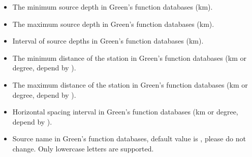 \documentclass[a4paper,10pt,english,openany]{sphinxmanual}
\begin{document}
\begin{itemize}
\item {} 
The minimum source depth in Green’s function databases (km).

\end{itemize}

\begin{itemize}
\item {} 
The maximum source depth in Green’s function databases (km).

\end{itemize}

\begin{itemize}
\item {} 
Interval of source depths in Green’s function databases (km).

\end{itemize}

\begin{itemize}
\item {} 
The minimum distance of the station in Green’s function databases (km or degree, depend by ).

\end{itemize}

\begin{itemize}
\item {} 
The maximum distance of the station in Green’s function databases (km or degree, depend by ).

\end{itemize}

\begin{itemize}
\item {} 
Horizontal spacing interval in Green’s function databases (km or degree, depend by ).

\end{itemize}

\begin{itemize}
\item {} 
Source name in Green’s function databases, default value is , please do not change.
Only lowercase letters are supported.

\end{itemize}
\end{document}
